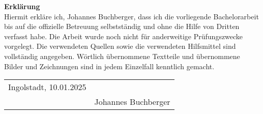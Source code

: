 {}
\textbf{\Large Erklärung}
\vspace{1.0cm}\\

Hiermit erkläre ich, Johannes Buchberger, dass ich die vorliegende Bachelorarbeit bis auf die offizielle
Betreuung selbstständig und ohne die Hilfe von Dritten verfasst habe. Die Arbeit wurde noch
nicht für anderweitige Prüfungszwecke vorgelegt.
Die verwendeten Quellen sowie die verwendeten Hilfsmittel sind vollständig angegeben. Wörtlich
übernommene Textteile und übernommene Bilder und Zeichnungen sind in jedem Einzelfall
kenntlich gemacht.
\vspace{2.0cm}\\

\begin{tabular}{@{}p{6cm}p{6cm}@{}}
Ingolstadt, 10.01.2025 & \hrulefill \\
& Johannes Buchberger \\
\end{tabular}
